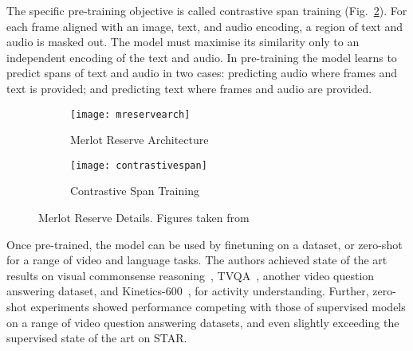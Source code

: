 The specific pre-training objective is called contrastive span training
(Fig.~\ref{fig:contrastivespan}). For each frame aligned with an image, text,
and audio encoding, a region of text and audio is masked out. The model must
maximise its similarity only to an independent encoding of the text and audio.
In pre-training the model learns to predict spans of text and audio in two
cases: predicting audio where frames and text is provided; and predicting text
where frames and audio are provided. 

\begin{figure}[htpb]
	\centering
	\begin{subfigure}[b]{0.45\textwidth}
		\centering
		\texttt{[image: mreservearch]}
		\caption{Merlot Reserve Architecture}
		\label{fig:mreservearch}
	\end{subfigure}
	\hfill
	\begin{subfigure}[b]{0.45\textwidth}
		\centering
		\texttt{[image: contrastivespan]}
		\caption{Contrastive Span Training}
		\label{fig:contrastivespan}
	\end{subfigure}
	\caption{Merlot Reserve Details. Figures taken from~\citet{zellers2022mreserve}}
	\label{fig:mreserve}
\end{figure}

Once pre-trained, the model can be used by finetuning on a dataset, or
zero-shot for a range of video and language tasks. The authors achieved state
of the art results on visual commonsense reasoning~\citep{zellers2019vcr},
TVQA~\citep{antol2015vqa}, another video question answering dataset, and
Kinetics-600~\citep{carreira2018kinetics600}, for activity understanding.
Further, zero-shot experiments showed performance competing with those of
supervised models on a range of video question answering datasets, and even
slightly exceeding the supervised state of the art on STAR.
